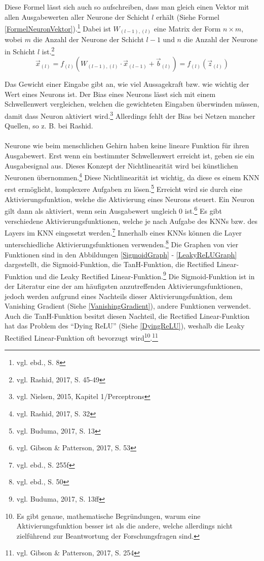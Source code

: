 \documentclass[
	a4paper,
	12pt,
	ngerman,
	oneside
]{scrreprt}											%
\begin{document}
			Diese Formel lässt sich auch so aufschreiben, dass man gleich einen Vektor mit allen Ausgabewerten aller Neurone der Schicht $l$ erhält (Siehe Formel \ref{FormelNeuronVektor}).\footnote{vgl. ebd., S. 8} Dabei ist $W_{(l-1),(l)}$ eine Matrix der Form $n\times m$, wobei $m$ die Anzahl der Neurone der Schicht $l-1$ und $n$ die Anzahl der Neurone in Schicht $l$ ist.\footnote{vgl. Rashid, 2017, S. 45-49}
			\begin{equation}\label{FormelNeuronVektor}
				\vec{x}_{(l)} = f_{(l)}(W_{(l-1),(l)} \cdot \vec{x}_{(l-1)} + \vec{b}_{(l)})  = f_{(l)}(\vec{z}_{(l)})
			\end{equation}
			
			
			Das Gewicht einer Eingabe gibt an, wie viel Aussagekraft bzw. wie wichtig der Wert eines Neurons ist. Der Bias eines Neurons lässt sich mit einem Schwellenwert vergleichen, welchen die gewichteten Eingaben überwinden müssen, damit dass Neuron aktiviert wird.\footnote{vgl. Nielsen, 2015, Kapitel 1/Perceptrons} Allerdings fehlt der Bias bei Netzen mancher Quellen, so z. B. bei Rashid.
			\ \\
			\ \\
			Neurone wie beim menschlichen Gehirn haben keine lineare Funktion für ihren Ausgabewert. Erst wenn ein bestimmter Schwellenwert erreicht ist, geben sie ein Ausgabesignal aus. Dieses Konzept der Nichtlinearität wird bei künstlichen Neuronen übernommen.\footnote{vgl. Rashid, 2017, S. 32} Diese Nichtlinearität ist wichtig, da diese es einem KNN erst ermöglicht, komplexere Aufgaben zu lösen.\footnote{vgl. Buduma, 2017, S. 13} Erreicht wird sie durch eine Aktivierungsfunktion, welche die Aktivierung eines Neurons steuert. Ein Neuron gilt dann als aktiviert, wenn sein Ausgabewert ungleich 0 ist.\footnote{vgl. Gibson \& Patterson, 2017, S. 53} Es gibt verschiedene Aktivierungsfunktionen, welche je nach Aufgabe des KNNs bzw. des Layers im KNN eingesetzt werden.\footnote{vgl. ebd., S. 255f} Innerhalb eines KNNs können die Layer unterschiedliche Aktivierungsfunktionen verwenden.\footnote{vgl. ebd., S. 50} Die Graphen von vier Funktionen sind in den Abbildungen \ref{SigmoidGraph} - \ref{LeakyReLUGraph} dargestellt, die Sigmoid-Funktion, die TanH-Funktion, die Rectified Linear-Funktion und die Leaky Rectified Linear-Funktion.\footnote{vgl. Buduma, 2017, S. 13ff} Die Sigmoid-Funktion ist in der Literatur eine der am häufigsten anzutreffenden Aktivierungsfunktionen, jedoch werden aufgrund eines Nachteils dieser Aktivierungsfunktion, dem Vanishing Gradient (Siehe \ref{VanishingGradient}), andere Funktionen verwendet. Auch die TanH-Funktion besitzt diesen Nachteil, die Rectified Linear-Funktion hat das Problem des "`Dying ReLU"' (Siehe \ref{DyingReLU}), weshalb die Leaky Rectified Linear-Funktion oft bevorzugt wird\footnote{Es gibt genaue, mathematische Begründungen, warum eine Aktivierungsfunktion besser ist als die andere, welche allerdings nicht zielführend zur Beantwortung der Forschungsfragen sind.}.\footnote{vgl. Gibson \& Patterson, 2017, S. 254}
		
\end{document}
